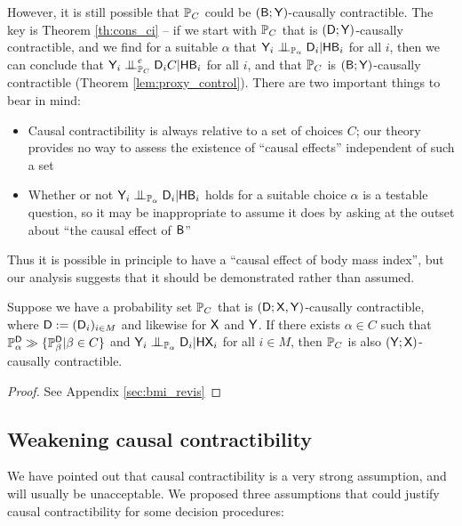 However, it is still possible that $\mathbb{P}_C$ could be $(\mathsf{B};\mathsf{Y})$-causally contractible. The key is Theorem \ref{th:cons_ci} -- if we start with $\mathbb{P}_C$ that is $(\mathsf{D};\mathsf{Y})$-causally contractible, and we find for a suitable $\alpha$ that $\RV{Y}_i\CI_{\prob{P}_\alpha} \RV{D}_i |\RV{H}\RV{B}_i$ for all $i$, then we can conclude that $\RV{Y}_i\CI_{\prob{P}_C}^e \RV{D}_i C|\RV{H}\RV{B}_i$ for all $i$, and that $\mathbb{P}_C$ is $(\mathsf{B};\mathsf{Y})$-causally contractible (Theorem \ref{lem:proxy_control}). There are two important things to bear in mind:

\begin{itemize}
    \item Causal contractibility is always relative to a set of choices $C$; our theory provides no way to assess the existence of ``causal effects'' independent of such a set
    \item Whether or not $\RV{Y}_i\CI_{\prob{P}_\alpha} \RV{D}_i |\RV{H}\RV{B}_i$ holds for a suitable choice $\alpha$ is a testable question, so it may be inappropriate to assume it does by asking at the outset about ``the causal effect of $\mathsf{B}$''
\end{itemize}

Thus it is possible in principle to have a ``causal effect of body mass index'', but our analysis suggests that it should be demonstrated rather than assumed.

\begin{theorem}\label{lem:proxy_control}
Suppose we have a probability set $\mathbb{P}_C$ that is $(\mathsf{D};\mathsf{X},\mathsf{Y})$-causally contractible, where $\mathsf{D}:=(\mathsf{D}_i)_{i\in M}$ and likewise for $\mathsf{X}$ and $\mathsf{Y}$. If there exists $\alpha\in C$ such that $\mathbb{P}_\alpha^{\mathsf{D}}\gg \{\mathbb{P}_\beta^{\mathsf{D}}|\beta\in C\}$ and $\RV{Y}_i\CI_{\prob{P}_\alpha} \RV{D}_i|\RV{HX}_i$ for all $i\in M$, then $\mathbb{P}_C$ is also $(\mathsf{Y};\mathsf{X})$-causally contractible.
\end{theorem}

\begin{proof}
See Appendix \ref{sec:bmi_revis}
\end{proof}

\subsection{Weakening causal contractibility}

We have pointed out that causal contractibility is a very strong assumption, and will usually be unacceptable. We proposed three assumptions that could justify causal contractibility for some decision procedures:

